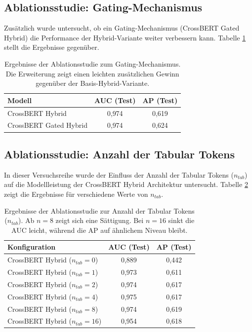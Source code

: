 \subsection{Ablationsstudie: Gating-Mechanismus}
\label{app:ablation_gating}

Zusätzlich wurde untersucht, ob ein Gating-Mechanismus (CrossBERT Gated Hybrid) die Performance der Hybrid-Variante weiter verbessern kann. Tabelle \ref{tab:ablation_gating} stellt die Ergebnisse gegenüber.

\begin{table}[h]
    \centering
    \caption{Ergebnisse der Ablationsstudie zum Gating-Mechanismus. Die Erweiterung zeigt einen leichten zusätzlichen Gewinn gegenüber der Basis-Hybrid-Variante.}
    \label{tab:ablation_gating}
    \begin{tabular}{lcc}
        \hline
        \textbf{Modell} & \textbf{AUC (Test)} & \textbf{AP (Test)} \\
        \hline
        CrossBERT Hybrid & 0{,}974 & 0{,}619 \\
        CrossBERT Gated Hybrid & 0{,}974 & 0{,}624 \\
        \hline
    \end{tabular}
\end{table}

\subsection{Ablationsstudie: Anzahl der Tabular Tokens}
\label{app:ablation_num_tokens}

In dieser Versuchsreihe wurde der Einfluss der Anzahl der Tabular Tokens ($n_{tab}$) auf die Modellleistung der CrossBERT Hybrid Architektur untersucht. Tabelle \ref{tab:ablation_num_tokens} zeigt die Ergebnisse für verschiedene Werte von $n_{tab}$.

\begin{table}[h]
    \centering
    \caption{Ergebnisse der Ablationsstudie zur Anzahl der Tabular Tokens ($n_{tab}$). Ab $n=8$ zeigt sich eine Sättigung. Bei $n=16$ sinkt die AUC leicht, während die AP auf ähnlichem Niveau bleibt.}
    \label{tab:ablation_num_tokens}
    \begin{tabular}{lcc}
        \hline
        \textbf{Konfiguration} & \textbf{AUC (Test)} & \textbf{AP (Test)} \\
        \hline
        CrossBERT Hybrid ($n_{tab} = 0$) & 0{,}889 & 0{,}442 \\
        CrossBERT Hybrid ($n_{tab} = 1$) & 0{,}973 & 0{,}611 \\
        CrossBERT Hybrid ($n_{tab} = 2$) & 0{,}974 & 0{,}617 \\
        CrossBERT Hybrid ($n_{tab} = 4$) & 0{,}975 & 0{,}617 \\
        CrossBERT Hybrid ($n_{tab} = 8$) & 0{,}974 & 0{,}619 \\
        CrossBERT Hybrid ($n_{tab} = 16$) & 0{,}954 & 0{,}618 \\
        \hline
    \end{tabular}
\end{table}
